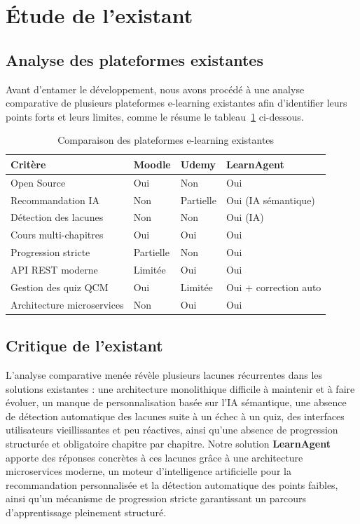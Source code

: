\documentclass[12pt,a4paper]{report}
\begin{document}
\section{Étude de l'existant}

\subsection{Analyse des plateformes existantes}

Avant d'entamer le développement, nous avons procédé à une analyse comparative de plusieurs plateformes e-learning existantes afin d'identifier leurs points forts et leurs limites, comme le résume le tableau~\ref{tab:comparaison} ci-dessous.

\begin{table}[H]
\centering
\caption{Comparaison des plateformes e-learning existantes}
\label{tab:comparaison}
\begin{tabularx}{\textwidth}{|l|X|X|X|}
\hline
\textbf{Critère} & \textbf{Moodle} & \textbf{Udemy} & \textbf{LearnAgent} \\
\hline
Open Source & Oui & Non & Oui \\
\hline
Recommandation IA & Non & Partielle & Oui (IA sémantique) \\
\hline
Détection des lacunes & Non & Non & Oui (IA) \\
\hline
Cours multi-chapitres & Oui & Oui & Oui \\
\hline
Progression stricte & Partielle & Non & Oui \\
\hline
API REST moderne & Limitée & Oui & Oui \\
\hline
Gestion des quiz QCM & Oui & Limitée & Oui + correction auto \\
\hline
Architecture microservices & Non & Oui & Oui \\
\hline
\end{tabularx}
\end{table}

\subsection{Critique de l'existant}

L'analyse comparative menée révèle plusieurs lacunes récurrentes dans les solutions existantes : une architecture monolithique difficile à maintenir et à faire évoluer, un manque de personnalisation basée sur l'IA sémantique, une absence de détection automatique des lacunes suite à un échec à un quiz, des interfaces utilisateurs vieillissantes et peu réactives, ainsi qu'une absence de progression structurée et obligatoire chapitre par chapitre. Notre solution \textbf{LearnAgent} apporte des réponses concrètes à ces lacunes grâce à une architecture microservices moderne, un moteur d'intelligence artificielle pour la recommandation personnalisée et la détection automatique des points faibles, ainsi qu'un mécanisme de progression stricte garantissant un parcours d'apprentissage pleinement structuré.
\end{document}

